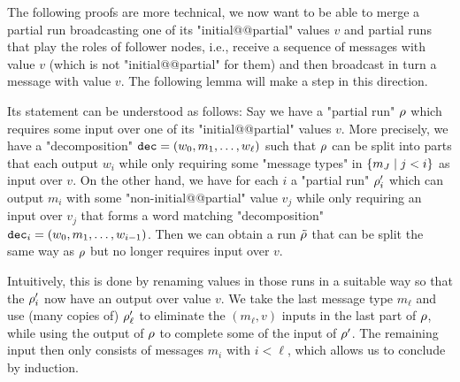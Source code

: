 The following proofs are more technical, we now want to be able to merge a partial run broadcasting one of its "initial@@partial" values $v$ and partial runs that play the roles of follower nodes, i.e., receive a sequence of messages with value $v$ (which is not "initial@@partial" for them) and then broadcast in turn a message with value $v$. The following lemma will make a step in this direction.

Its statement can be understood as follows: Say we have a "partial run" $\rho$ which requires some input over one of its "initial@@partial" values $v$. More precisely, we have a "decomposition" $\mathtt{dec} = (w_0, m_1, \ldots, w_\ell)$ such that $\rho$ can be split into parts that each output $w_i$ while only requiring some "message types" in $\{m_J \mid j<i \}$ as input over $v$. On the other hand, we have for each $i$ a "partial run" $\rho'_i$ which can output $m_i$ with some "non-initial@@partial" value $v_j$ while only requiring an input over $v_j$ that forms a word matching "decomposition" $\mathtt{dec}_i = (w_0, m_1, \ldots, w_{i-1})$. 
Then we can obtain  a run $\Tilde{\rho}$ that can be split the same way as $\rho$ but no longer requires input over $v$.

Intuitively, this is done by renaming values in those runs in a suitable way so that the $\rho'_i$ now have an output over value $v$. We take the last message type $m_\ell$ and use (many copies of) $\rho'_\ell$ to eliminate the $(m_\ell, v)$ inputs in the last part of $\rho$, while using the output of $\rho$ to complete some of the input of $\rho'$. 
The remaining input then only consists of messages $m_{i}$ with $i<\ell$, which allows us to conclude by induction.

